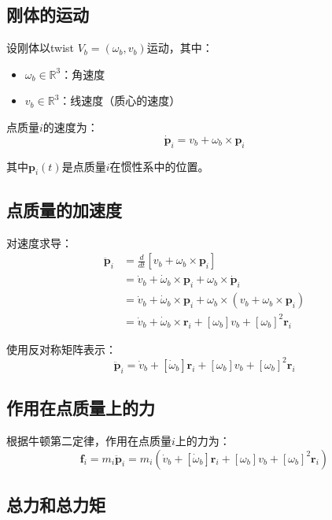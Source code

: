 \documentclass[12pt,a4paper]{article}
\begin{document}
\subsection{刚体的运动}

设刚体以twist $V_b = (\omega_b, v_b)$运动，其中：
\begin{itemize}
\item $\omega_b \in \mathbb{R}^3$：角速度
\item $v_b \in \mathbb{R}^3$：线速度（质心的速度）
\end{itemize}

点质量$i$的速度为：
\begin{equation}
\dot{\bm{p}}_i = v_b + \omega_b \times \bm{p}_i
\end{equation}

其中$\bm{p}_i(t)$是点质量$i$在惯性系中的位置。

\subsection{点质量的加速度}

对速度求导：
\begin{align}
\ddot{\bm{p}}_i &= \frac{d}{dt}[v_b + \omega_b \times \bm{p}_i] \\
&= \dot{v}_b + \dot{\omega}_b \times \bm{p}_i + \omega_b \times \dot{\bm{p}}_i \\
&= \dot{v}_b + \dot{\omega}_b \times \bm{p}_i + \omega_b \times (v_b + \omega_b \times \bm{p}_i) \\
&= \dot{v}_b + \dot{\omega}_b \times \bm{r}_i + [\omega_b]v_b + [\omega_b]^2 \bm{r}_i
\end{align}

使用反对称矩阵表示：
\begin{equation}
\ddot{\bm{p}}_i = \dot{v}_b + [\dot{\omega}_b]\bm{r}_i + [\omega_b]v_b + [\omega_b]^2 \bm{r}_i
\label{eq:point_acceleration}
\end{equation}

\subsection{作用在点质量上的力}

根据牛顿第二定律，作用在点质量$i$上的力为：
\begin{equation}
\bm{f}_i = m_i \ddot{\bm{p}}_i = m_i(\dot{v}_b + [\dot{\omega}_b]\bm{r}_i + [\omega_b]v_b + [\omega_b]^2 \bm{r}_i)
\end{equation}

\subsection{总力和总力矩}
\end{document}
